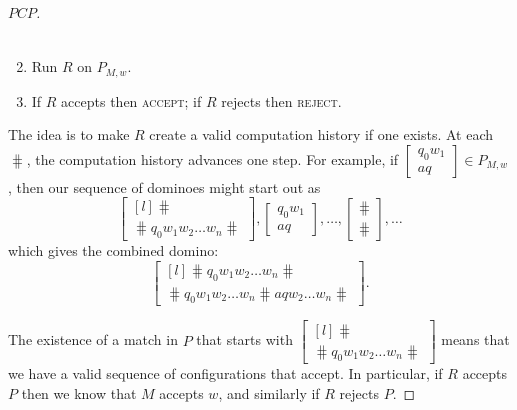\documentclass{standalone}
\begin{document}
\begin{proof}[\(\mathit{PCP}\)]
\begin{enumerate}[start=0]
\[\begin{multlined}
{        }
      \end{multlined}
    \]
    \item Run \(R\) on \(P_{M, w}\).
    \item If \(R\) accepts then \textsc{accept};
          if \(R\) rejects then \textsc{reject}.
  \end{enumerate}
  The idea is to make \(R\) create a valid computation history if one exists.
  At each \(\hash\), the computation history advances one step.
  For example, if \(\begin{bmatrix} q_0 w_1 \\ a q \end{bmatrix} \in P_{M, w}\),
  then our sequence of dominoes might start out as
  \[
    \begin{bmatrix*}[l]
      \hash \\
      \hash q_0 w_1 w_2 \dots w_n \hash
    \end{bmatrix*},
    \begin{bmatrix} q_0 w_1 \\ a q \end{bmatrix},
    \dots,
    \begin{bmatrix} \hash \\ \hash \end{bmatrix},
    \dots
  \]
  which gives the combined domino:
  \[
    \begin{bmatrix*}[l]
      \hash q_0 w_1 w_2 \dots w_n \hash \\
      \hash q_0 w_1 w_2 \dots w_n \hash a q w_2 \dots w_n \hash
    \end{bmatrix*}.
  \]
  
  The existence of a match in \(P\) that starts with
  \(\begin{bmatrix*}[l]
      \hash \\
      \hash q_0 w_1 w_2 \dots w_n \hash
    \end{bmatrix*}\)
  means that we have a valid sequence of configurations that accept.
  In particular, if \(R\) accepts \(P\) then we know that \(M\) accepts \(w\),
  and similarly if \(R\) rejects \(P\).
\end{proof}
\end{document}
